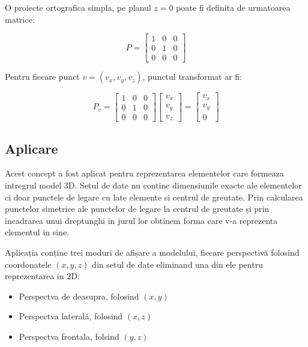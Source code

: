 O proiecte ortografica simpla, pe planul \(z=0\) poate fi definita de urmatoarea matrice:

\[
P=
  \begin{bmatrix}
    1 & 0 & 0 \\
    0 & 1 & 0 \\
    0 & 0 & 0 
  \end{bmatrix}
\]

Pentru fiecare punct \(v=(v_x,v_y,v_z)\), punctul transformat ar fi:

\[
P_v=
  \begin{bmatrix}
    1 & 0 & 0 \\
    0 & 1 & 0 \\
    0 & 0 & 0 
  \end{bmatrix}
  \begin{bmatrix}
    v_x  \\
    v_y  \\
    v_z  
  \end{bmatrix}
  =
  \begin{bmatrix}
    v_x  \\
    v_y  \\
    0  
  \end{bmatrix}
\]

\subsection{Aplicare}

Acest concept a fost aplicat pentru reprezentarea elementelor care formeaza intregrul model 3D. 
Setul de date nu contine dimensiunile exacte ale elementelor ci doar punctele de legare cu late elemente si centrul de greutate.
Prin calcularea punctelor simetrice ale punctelor de legare la centrul de greutate și prin incadrarea unui dreptunghi in jurul lor
obtinem forma care v-a reprezenta elementul in sine.\newline 

Aplicația conține trei moduri de afișare a modelului, fiecare perspectivă folosind coordonatele \((x,y,z)\) din setul de date 
eliminand una din ele pentru reprezentarea in 2D:
\begin{itemize}
\item Perspectva de deasupra, folosind \((x,y)\)     
\item Perspectva laterală, folosind \((x,z)\)
\item Perspectva frontala, folsind \((y,z)\)
\end{itemize}